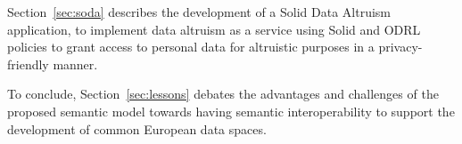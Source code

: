 Section~\ref{sec:soda} describes the development of a Solid Data Altruism application, to implement data altruism as a service using Solid and ODRL policies to grant access to personal data for altruistic purposes in a privacy-friendly manner.

To conclude, Section~\ref{sec:lessons} debates the advantages and challenges of the proposed semantic model towards having semantic interoperability to support the development of common European data spaces.





